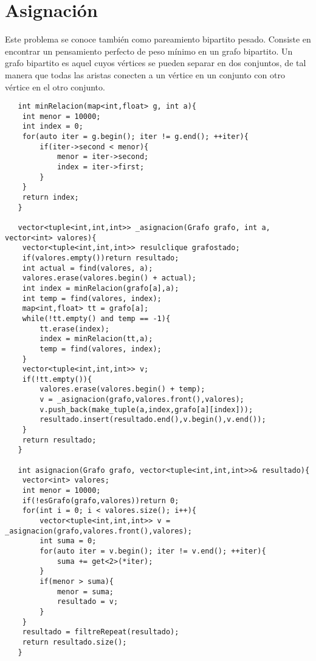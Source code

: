 \documentclass[a4paper,12pt]{article}
\begin{document}
  \section{Asignación}
  Este problema se conoce también como pareamiento bipartito pesado. Consiste en
  encontrar un pensamiento perfecto de peso mínimo en un grafo bipartito. Un
  grafo bipartito es aquel cuyos vértices se pueden separar en dos conjuntos, de
  tal manera que todas las aristas conecten a un vértice en un conjunto con otro vértice en el otro conjunto.
  \begin{lstlisting}
   int minRelacion(map<int,float> g, int a){
    int menor = 10000;
    int index = 0;
    for(auto iter = g.begin(); iter != g.end(); ++iter){
        if(iter->second < menor){
            menor = iter->second;
            index = iter->first;
        }
    }
    return index;
   }
   
   vector<tuple<int,int,int>> _asignacion(Grafo grafo, int a, vector<int> valores){
    vector<tuple<int,int,int>> resulclique grafostado;
    if(valores.empty())return resultado;
    int actual = find(valores, a);
    valores.erase(valores.begin() + actual);
    int index = minRelacion(grafo[a],a);
    int temp = find(valores, index);
    map<int,float> tt = grafo[a];
    while(!tt.empty() and temp == -1){
        tt.erase(index);
        index = minRelacion(tt,a);
        temp = find(valores, index);
    }
    vector<tuple<int,int,int>> v;
    if(!tt.empty()){
        valores.erase(valores.begin() + temp);
        v = _asignacion(grafo,valores.front(),valores);
        v.push_back(make_tuple(a,index,grafo[a][index]));
        resultado.insert(resultado.end(),v.begin(),v.end());
    }
    return resultado;
   }
   
   int asignacion(Grafo grafo, vector<tuple<int,int,int>>& resultado){
    vector<int> valores;
    int menor = 10000;
    if(!esGrafo(grafo,valores))return 0;
    for(int i = 0; i < valores.size(); i++){
        vector<tuple<int,int,int>> v = _asignacion(grafo,valores.front(),valores);
        int suma = 0;
        for(auto iter = v.begin(); iter != v.end(); ++iter){
            suma += get<2>(*iter);
        }
        if(menor > suma){
            menor = suma;
            resultado = v;
        }
    }
    resultado = filtreRepeat(resultado);
    return resultado.size();
   }
  \end{lstlisting}
\end{document}

